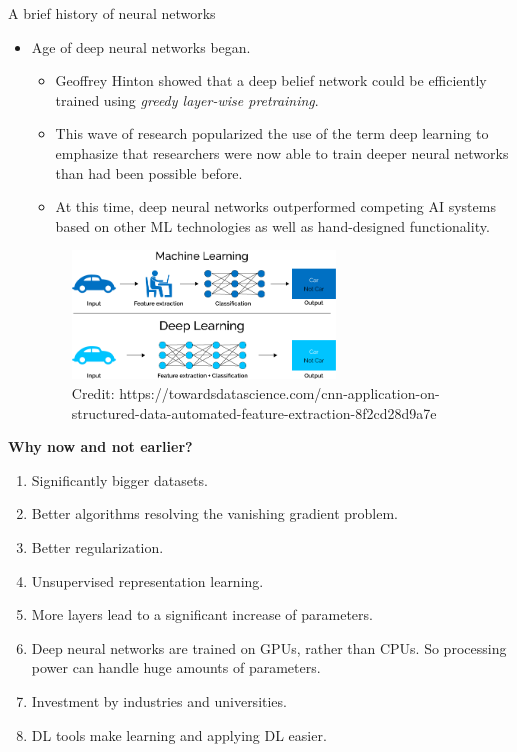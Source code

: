 \begin{vbframe}{A brief history of neural networks}
\begin{itemize}
\item {} Age of deep neural networks began.

\begin{itemize}
\footnotesize\item Geoffrey Hinton showed that a deep belief network could be efficiently trained using \textit{greedy layer-wise pretraining}.
\footnotesize\item This wave of research popularized the use of the term deep learning to emphasize that researchers were now able to train deeper neural networks than had been possible before.
\footnotesize\item At this time, deep neural networks outperformed competing AI systems based on other ML technologies as well as hand-designed functionality.
\end{itemize}
\begin{figure}
\includegraphics[width=7cm]{figure/dl_feature2.png}
\\
\tiny{Credit: https://towardsdatascience.com/cnn-application-on-structured-data-automated-feature-extraction-8f2cd28d9a7e}
\end{figure}
\end{itemize}
\framebreak

\textbf{Why now and not earlier?}
\begin{enumerate}
\vspace{2mm}
\item Significantly bigger datasets.
\vspace{2mm}
\item Better algorithms resolving the vanishing gradient problem.
\vspace{2mm}
\item Better regularization.
\vspace{2mm}
\item Unsupervised representation learning.
\vspace{2mm}
\item More layers lead to a significant increase of parameters.
\vspace{2mm}
\item Deep neural networks are trained on GPUs, rather than CPUs. So processing power can handle huge amounts of parameters.
\vspace{2mm}
\item Investment by industries and universities.
\vspace{2mm}
\item DL tools make learning and applying DL easier.
\end{enumerate}
\framebreak


\end{vbframe}
